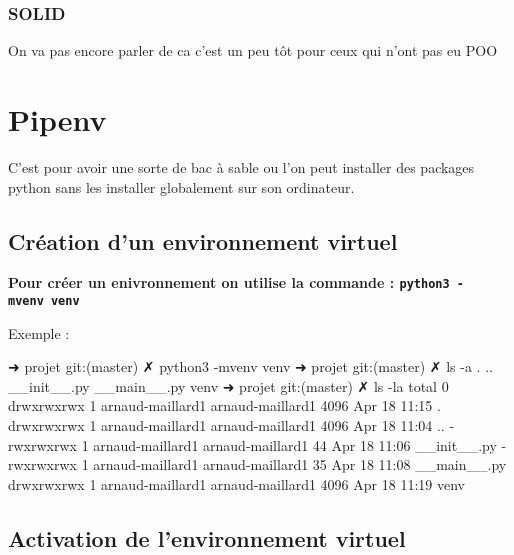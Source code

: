 \documentclass[11pt]{article}
\newenvironment{Shaded}{}{}
\newcommand{\FunctionTok}[1]{\textcolor[rgb]{0.02,0.16,0.49}{{#1}}}
\newcommand{\NormalTok}[1]{{#1}}
\newcommand{\BuiltInTok}[1]{{#1}}
\newcommand{\ExtensionTok}[1]{{#1}}
\begin{document}
\hypertarget{solid}{%
\subsubsection{SOLID}\label{solid}}

On va pas encore parler de ca c'est un peu tôt pour ceux qui n'ont pas
eu POO

\hypertarget{pipenv}{%
\section{Pipenv}\label{pipenv}}

C'est pour avoir une sorte de bac à sable ou l'on peut installer des
packages python sans les installer globalement sur son ordinateur.

\hypertarget{cruxe9ation-dun-environnement-virtuel}{%
\subsection{Création d'un environnement
virtuel}\label{cruxe9ation-dun-environnement-virtuel}}

\textbf{Pour créer un enivronnement on utilise la commande :
\texttt{python3\ -mvenv\ venv}}

Exemple :

\begin{Shaded}
\begin{Highlighting}[]
\NormalTok{➜  }\ExtensionTok{projet}\NormalTok{ git:(master) ✗ }\ExtensionTok{python3}\NormalTok{ -mvenv venv}
\NormalTok{➜  }\ExtensionTok{projet}\NormalTok{ git:(master) ✗ }\FunctionTok{ls}\NormalTok{ -a}
\BuiltInTok{.}  \ExtensionTok{..}\NormalTok{  __init__.py  __main__.py  venv}
\NormalTok{➜  }\ExtensionTok{projet}\NormalTok{ git:(master) ✗ }\FunctionTok{ls}\NormalTok{ -la}
\ExtensionTok{total}\NormalTok{ 0}
\ExtensionTok{drwxrwxrwx}\NormalTok{ 1 arnaud-maillard1 arnaud-maillard1 4096 Apr 18 11:15 .}
\ExtensionTok{drwxrwxrwx}\NormalTok{ 1 arnaud-maillard1 arnaud-maillard1 4096 Apr 18 11:04 ..}
\ExtensionTok{-rwxrwxrwx}\NormalTok{ 1 arnaud-maillard1 arnaud-maillard1   44 Apr 18 11:06 __init__.py}
\ExtensionTok{-rwxrwxrwx}\NormalTok{ 1 arnaud-maillard1 arnaud-maillard1   35 Apr 18 11:08 __main__.py}
\ExtensionTok{drwxrwxrwx}\NormalTok{ 1 arnaud-maillard1 arnaud-maillard1 4096 Apr 18 11:19 venv}
\end{Highlighting}
\end{Shaded}

\hypertarget{activation-de-lenvironnement-virtuel}{%
\subsection{Activation de l'environnement
virtuel}\label{activation-de-lenvironnement-virtuel}}
\end{document}
